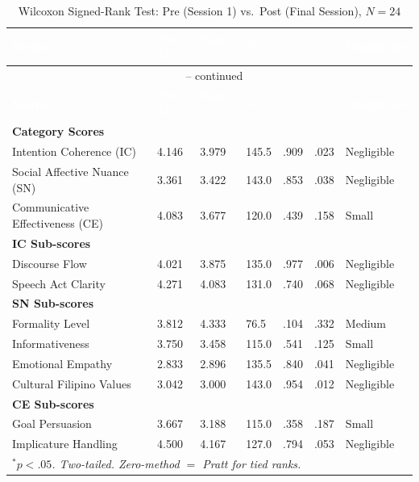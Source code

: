 \begin{longtable}{p{4.5cm} p{0.9cm} p{0.9cm} p{0.9cm} p{0.9cm} p{0.7cm} p{2.5cm}}
\caption{Wilcoxon Signed-Rank Test: Pre (Session 1) vs.\ Post (Final Session), $N = 24$}
\label{tab:wilcoxon-results} \\

\rowcolor{headerblue}
\textcolor{white}{\textbf{Metric}} &
\textcolor{white}{\textbf{Pre $M$}} &
\textcolor{white}{\textbf{Post $M$}} &
\textcolor{white}{\textbf{$W$}} &
\textcolor{white}{\textbf{$p$}} &
\textcolor{white}{\textbf{$r$}} &
\textcolor{white}{\textbf{Magnitude}} \\
\endfirsthead
\multicolumn{7}{c}{\tablename\ \thetable{} -- continued} \\
\rowcolor{headerblue}
\textcolor{white}{\textbf{Metric}} &
\textcolor{white}{\textbf{Pre $M$}} &
\textcolor{white}{\textbf{Post $M$}} &
\textcolor{white}{\textbf{$W$}} &
\textcolor{white}{\textbf{$p$}} &
\textcolor{white}{\textbf{$r$}} &
\textcolor{white}{\textbf{Magnitude}} \\
\endhead

\midrule
\multicolumn{7}{l}{\textbf{Category Scores}} \\
\midrule
Intention Coherence (IC) & 4.146 & 3.979 & 145.5 & .909 & .023 & Negligible \\
\midrule
Social Affective Nuance (SN) & 3.361 & 3.422 & 143.0 & .853 & .038 & Negligible \\
\midrule
Communicative Effectiveness (CE) & 4.083 & 3.677 & 120.0 & .439 & .158 & Small \\
\midrule
\multicolumn{7}{l}{\textbf{IC Sub-scores}} \\
\midrule
\quad Discourse Flow & 4.021 & 3.875 & 135.0 & .977 & .006 & Negligible \\
\midrule
\quad Speech Act Clarity & 4.271 & 4.083 & 131.0 & .740 & .068 & Negligible \\
\midrule
\multicolumn{7}{l}{\textbf{SN Sub-scores}} \\
\midrule
\quad Formality Level & 3.812 & 4.333 & 76.5 & .104 & .332 & Medium \\
\midrule
\quad Informativeness & 3.750 & 3.458 & 115.0 & .541 & .125 & Small \\
\midrule
\quad Emotional Empathy & 2.833 & 2.896 & 135.5 & .840 & .041 & Negligible \\
\midrule
\quad Cultural Filipino Values & 3.042 & 3.000 & 143.0 & .954 & .012 & Negligible \\
\midrule
\multicolumn{7}{l}{\textbf{CE Sub-scores}} \\
\midrule
\quad Goal Persuasion & 3.667 & 3.188 & 115.0 & .358 & .187 & Small \\
\midrule
\quad Implicature Handling & 4.500 & 4.167 & 127.0 & .794 & .053 & Negligible \\
\midrule
\multicolumn{7}{l}{\textit{$^{*}p < .05$. Two-tailed. Zero-method $=$ Pratt for tied ranks.}} \\
\bottomrule
\end{longtable}

